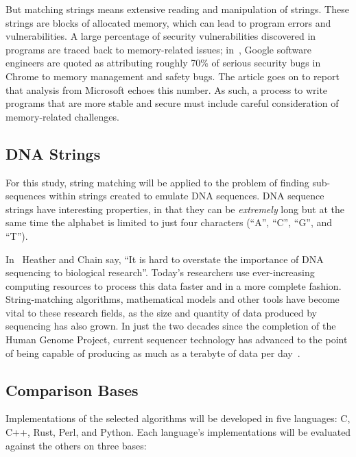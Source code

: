 But matching strings means extensive reading and manipulation of strings. These strings are blocks of allocated memory, which can lead to program errors and vulnerabilities. A large percentage of security vulnerabilities discovered in programs are traced back to memory-related issues; in~\cite{cimpanu}, Google software engineers are quoted as attributing roughly 70\% of serious security bugs in Chrome to memory management and safety bugs. The article goes on to report that analysis from Microsoft echoes this number. As such, a process to write programs that are more stable and secure must include careful consideration of memory-related challenges.

\subsection{DNA Strings}

For this study, string matching will be applied to the problem of finding sub-sequences within strings created to emulate DNA sequences. DNA sequence strings have interesting properties, in that they can be \textit{extremely} long but at the same time the alphabet is limited to just four characters (``A'', ``C'', ``G'', and ``T'').

In~\cite{heather} Heather and Chain say, ``It is hard to overstate the importance of DNA sequencing to biological research''. Today's researchers use ever-increasing computing resources to process this data faster and in a more complete fashion. String-matching algorithms, mathematical models and other tools have become vital to these research fields, as the size and quantity of data produced by sequencing has also grown. In just the two decades since the completion of the Human Genome Project, current sequencer technology has advanced to the point of being capable of producing as much as a terabyte of data per day~\cite{cabral}.

\subsection{Comparison Bases}
\label{subsec:comparison}

Implementations of the selected algorithms will be developed in five languages: C, C++, Rust, Perl, and Python. Each language's implementations will be evaluated against the others on three bases:

